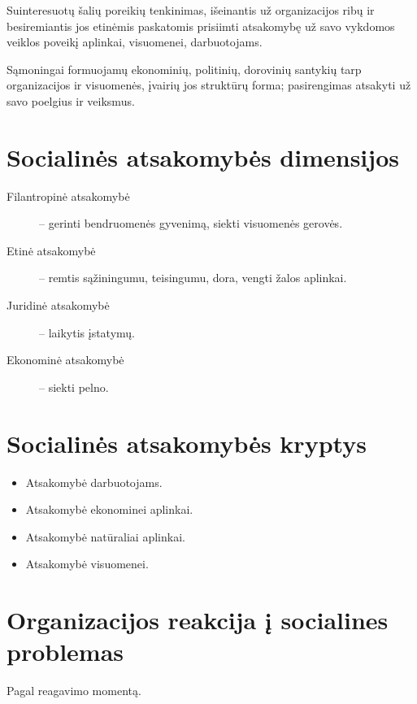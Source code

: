 \begin{defn}
  Suinteresuotų šalių poreikių tenkinimas, išeinantis už organizacijos
  ribų ir besiremiantis jos etinėmis paskatomis prisiimti atsakomybę
  už savo vykdomos veiklos poveikį aplinkai, visuomenei, darbuotojams.
\end{defn}

\begin{defn}
  Sąmoningai formuojamų ekonominių, politinių, dorovinių santykių
  tarp organizacijos ir visuomenės, įvairių jos struktūrų forma;
  pasirengimas atsakyti už savo poelgius ir veiksmus.
\end{defn}

\section{Socialinės atsakomybės dimensijos}

\begin{description}
  \item[Filantropinė atsakomybė] – gerinti bendruomenės gyvenimą, siekti
    visuomenės gerovės.
  \item[Etinė atsakomybė] – remtis sąžiningumu, teisingumu, dora, vengti
    žalos aplinkai.
  \item[Juridinė atsakomybė] – laikytis įstatymų.
  \item[Ekonominė atsakomybė] – siekti pelno.
\end{description}

\section{Socialinės atsakomybės kryptys}

\begin{itemize}
  \item Atsakomybė darbuotojams.
  \item Atsakomybė ekonominei aplinkai.
  \item Atsakomybė natūraliai aplinkai.
  \item Atsakomybė visuomenei.
\end{itemize}

\section{Organizacijos reakcija į socialines problemas}

Pagal reagavimo momentą.

